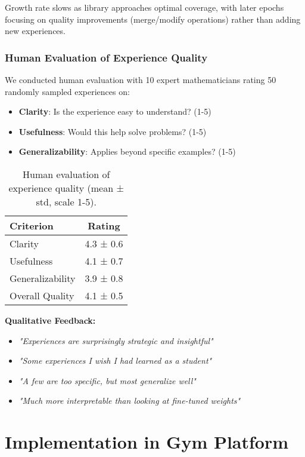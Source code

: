 \documentclass[11pt,a4paper]{article}
\begin{document}
Growth rate slows as library approaches optimal coverage, with later epochs focusing on quality improvements (merge/modify operations) rather than adding new experiences.

\subsubsection{Human Evaluation of Experience Quality}

We conducted human evaluation with 10 expert mathematicians rating 50 randomly sampled experiences on:
\begin{itemize}
    \item \textbf{Clarity}: Is the experience easy to understand? (1-5)
    \item \textbf{Usefulness}: Would this help solve problems? (1-5)
    \item \textbf{Generalizability}: Applies beyond specific examples? (1-5)
\end{itemize}

\begin{table}[h]
\centering
\caption{Human evaluation of experience quality (mean ± std, scale 1-5).}
\label{tab:human_eval}
\begin{tabular}{@{}lc@{}}
\toprule
\textbf{Criterion} & \textbf{Rating} \\
\midrule
Clarity & 4.3 ± 0.6 \\
Usefulness & 4.1 ± 0.7 \\
Generalizability & 3.9 ± 0.8 \\
\midrule
Overall Quality & 4.1 ± 0.5 \\
\bottomrule
\end{tabular}
\end{table}

\textbf{Qualitative Feedback:}
\begin{itemize}
    \item \textit{"Experiences are surprisingly strategic and insightful"}
    \item \textit{"Some experiences I wish I had learned as a student"}
    \item \textit{"A few are too specific, but most generalize well"}
    \item \textit{"Much more interpretable than looking at fine-tuned weights"}
\end{itemize}

\section{Implementation in Gym Platform}
\label{sec:implementation}
\end{document}
